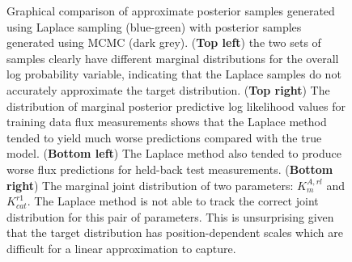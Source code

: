 \documentclass[journal=asbcd6,manuscript=article,layout=traditional]{achemso}
\begin{document}
\begin{figure}

\begin{minipage}[t]{\linewidth}

{\centering 


}

\end{minipage}%

\caption{\label{fig-laplace}Graphical comparison of approximate
posterior samples generated using Laplace sampling (blue-green) with
posterior samples generated using MCMC (dark grey). (\textbf{Top left})
the two sets of samples clearly have different marginal distributions
for the overall log probability variable, indicating that the Laplace
samples do not accurately approximate the target distribution.
(\textbf{Top right}) The distribution of marginal posterior predictive
log likelihood values for training data flux measurements shows that the
Laplace method tended to yield much worse predictions compared with the
true model. (\textbf{Bottom left}) The Laplace method also tended to
produce worse flux predictions for held-back test measurements.
(\textbf{Bottom right}) The marginal joint distribution of two
parameters: \(K_m^{A,rl}\) and \(K_{cat}^{r1}\). The Laplace method is
not able to track the correct joint distribution for this pair of
parameters. This is unsurprising given that the target distribution has
position-dependent scales which are difficult for a linear approximation
to capture.}

\end{figure}
\end{document}
